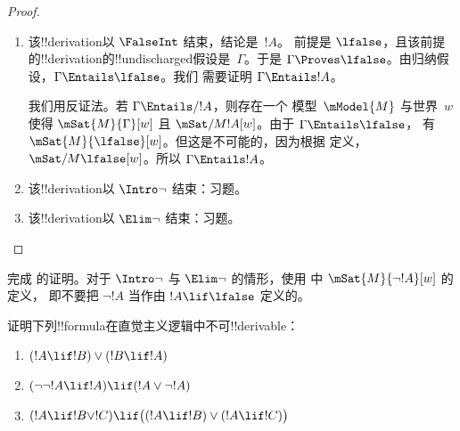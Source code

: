 \documentclass[../../../include/open-logic-section]{subfiles}
\begin{document}
\begin{proof}
\begin{enumerate}
  \item 该!!{derivation}以 $\FalseInt$ 结束，结论是~$!A$。
    前提是 $\lfalse$，且该前提的!!{derivation}的!!{undischarged}假设是~$\Gamma$。于是 $\Gamma \Proves
    \lfalse$。由归纳假设，$\Gamma \Entails \lfalse$。我们
    需要证明 $\Gamma \Entails !A$。

    我们用反证法。若 $\Gamma \Entails/ !A$，则存在一个
    模型~$\mModel{M}$ 与世界~$w$ 使得 $\mSat{M}{\Gamma}[w]$
    且 $\mSat/{M}{!A}[w]$。由于 $\Gamma \Entails \lfalse$，
    有 $\mSat{M}{\lfalse}[w]$。但这是不可能的，因为根据
    定义，$\mSat/{M}{\lfalse}[w]$。所以 $\Gamma \Entails !A$。
  \item 该!!{derivation}以 $\Intro\lnot$ 结束：习题。
  \item 该!!{derivation}以 $\Elim\lnot$ 结束：习题。
  \end{enumerate}
\end{proof}

\begin{prob}
  完成  的证明。对于
  $\Intro\lnot$ 与 $\Elim\lnot$ 的情形，使用
   中 $\mSat{M}{\lnot !A}[w]$ 的定义，
  即不要把 $\lnot !A$ 当作由 $!A \lif \lfalse$ 定义的。
\end{prob}

\begin{prob}
  证明下列!!{formula}在直觉主义逻辑中不可!!{derivable}：
  \begin{enumerate}
    \item $(!A \lif !B) \lor (!B \lif !A)$
    \item $(\lnot\lnot !A \lif !A) \lif (!A \lor \lnot !A)$
    \item $(!A \lif !B \lor !C) \lif \bigl((!A \lif !B)\lor(!A \lif !C)\bigr)$
  \end{enumerate}
\end{prob}
\end{document}
